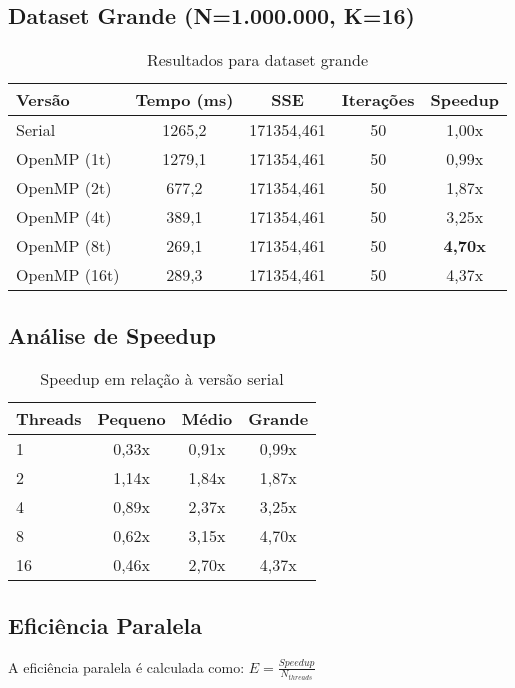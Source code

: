 \documentclass[12pt,a4paper]{article}
\begin{document}
\subsection{Dataset Grande (N=1.000.000, K=16)}

\begin{table}[H]
\centering
\begin{tabular}{lcccc}
\toprule
\textbf{Versão} & \textbf{Tempo (ms)} & \textbf{SSE} & \textbf{Iterações} & \textbf{Speedup} \\
\midrule
Serial & 1265,2 & 171354,461 & 50 & 1,00x \\
OpenMP (1t) & 1279,1 & 171354,461 & 50 & 0,99x \\
OpenMP (2t) & 677,2 & 171354,461 & 50 & 1,87x \\
OpenMP (4t) & 389,1 & 171354,461 & 50 & 3,25x \\
OpenMP (8t) & 269,1 & 171354,461 & 50 & \textbf{4,70x} \\
OpenMP (16t) & 289,3 & 171354,461 & 50 & 4,37x \\
\bottomrule
\end{tabular}
\caption{Resultados para dataset grande}
\end{table}

\subsection{Análise de Speedup}

\begin{table}[H]
\centering
\begin{tabular}{lccc}
\toprule
\textbf{Threads} & \textbf{Pequeno} & \textbf{Médio} & \textbf{Grande} \\
\midrule
1 & 0,33x & 0,91x & 0,99x \\
2 & 1,14x & 1,84x & 1,87x \\
4 & 0,89x & 2,37x & 3,25x \\
8 & 0,62x & 3,15x & 4,70x \\
16 & 0,46x & 2,70x & 4,37x \\
\bottomrule
\end{tabular}
\caption{Speedup em relação à versão serial}
\end{table}

\subsection{Eficiência Paralela}

A eficiência paralela é calculada como: $E = \frac{Speedup}{N_{threads}}$
\end{document}
